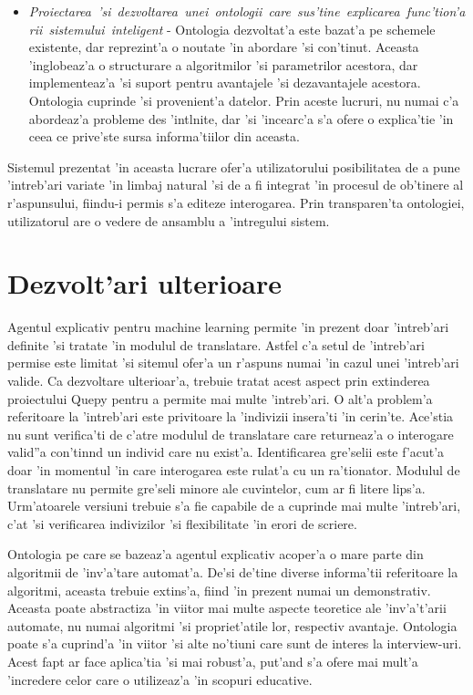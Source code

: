 \documentclass[12pt,a4paper,twoside]{report}
\begin{document}
\begin{itemize}
    \item {\it Proiectarea\ 'si\ dezvoltarea\ unei\ ontologii\ care\ sus'tine\ explicarea\ func'tion'arii\ sistemului\ inteligent} -  Ontologia dezvoltat'a este bazat'a pe schemele existente, dar reprezint'a o noutate 'in abordare 'si con'tinut. Aceasta 'inglobeaz'a o structurare a algoritmilor 'si parametrilor acestora, dar implementeaz'a 'si suport pentru avantajele 'si dezavantajele acestora. Ontologia cuprinde 'si provenient'a datelor. Prin aceste lucruri, nu numai c'a abordeaz'a probleme des 'int\ia lnite, dar 'si 'incearc'a s'a ofere o explica'tie 'in ceea ce prive'ste sursa informa'tiilor din aceasta.
\end{itemize}

Sistemul prezentat 'in aceasta lucrare ofer'a utilizatorului posibilitatea de a pune 'intreb'ari variate 'in limbaj natural 'si de a fi integrat 'in procesul de ob'tinere al r'aspunsului, fiindu-i permis s'a editeze interogarea. Prin transparen'ta ontologiei, utilizatorul are o vedere de ansamblu a 'intregului sistem.
\section{Dezvolt'ari ulterioare}

Agentul explicativ pentru machine learning permite 'in prezent doar 'intreb'ari definite 'si tratate 'in modulul de translatare. Astfel c'a setul de 'intreb'ari permise este limitat 'si sitemul ofer'a un r'aspuns numai 'in cazul unei 'intreb'ari valide. Ca dezvoltare ulterioar'a, trebuie tratat acest aspect prin extinderea proiectului Quepy pentru a permite mai multe 'intreb'ari. O alt'a problem'a referitoare la 'intreb'ari este privitoare la 'indivizii insera'ti 'in cerin'te. Ace'stia nu sunt verifica'ti de c'atre modulul de translatare care returneaz'a o interogare valid''a con'tin\ia nd un individ care nu exist'a. Identificarea gre'selii este f'acut'a doar 'in momentul 'in care interogarea este rulat'a cu un ra'tionator. Modulul de translatare nu permite gre'seli minore ale cuvintelor, cum ar fi litere lips'a. Urm'atoarele versiuni trebuie s'a fie capabile de a cuprinde mai multe 'intreb'ari, c'at 'si verificarea indivizilor 'si flexibilitate 'in erori de scriere.

Ontologia pe care se bazeaz'a agentul explicativ acoper'a o mare parte din algoritmii de 'inv'a'tare automat'a. De'si de'tine diverse informa'tii referitoare la algoritmi, aceasta trebuie extins'a, fiind 'in prezent numai un demonstrativ. Aceasta poate abstractiza 'in viitor mai multe aspecte teoretice ale 'inv'a't'arii automate, nu numai algoritmi 'si propriet'atile lor, respectiv avantaje. Ontologia poate s'a cuprind'a 'in viitor 'si alte no'tiuni care sunt de interes la interview-uri. Acest fapt ar face aplica'tia 'si mai robust'a, put'and s'a ofere mai mult'a 'incredere celor care o utilizeaz'a 'in scopuri educative.
\end{document}
